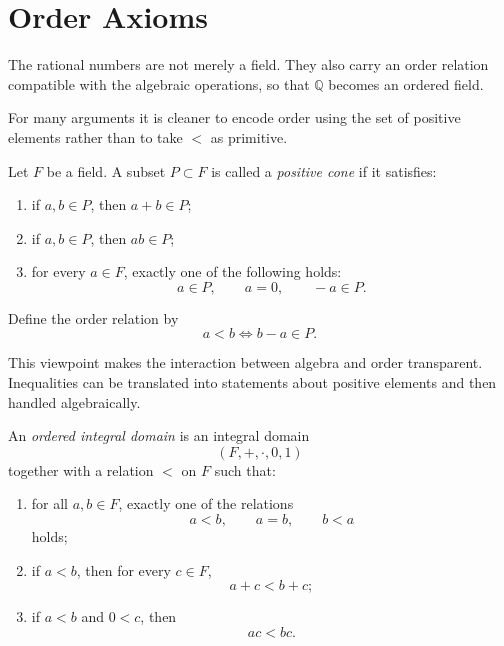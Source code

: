 
\section{Order Axioms}
\label{sec:order-axioms-q}

The rational numbers are not merely a field. They also carry an order
relation compatible with the algebraic operations, so that $\mathbb{Q}$
becomes an ordered field.

\begin{remark}
For many arguments it is cleaner to encode order using the set of
positive elements rather than to take $<$ as primitive.
\end{remark}

\begin{definition}
\label{def:positive-cone}
Let $F$ be a field. A subset $P\subset F$ is called a \emph{positive
cone} if it satisfies:
\begin{enumerate}
  \item if $a,b\in P$, then $a+b\in P$;
  \item if $a,b\in P$, then $ab\in P$;
  \item for every $a\in F$, exactly one of the following holds:
  \[
  a\in P,
  \qquad
  a=0,
  \qquad
  -a\in P.
  \]
\end{enumerate}
Define the order relation by
\[
a<b \iff b-a\in P.
\]
\end{definition}

\begin{remark}
This viewpoint makes the interaction between algebra and order
transparent. Inequalities can be translated into statements about
positive elements and then handled algebraically.
\end{remark}

\begin{definition}
\label{def:ordered-integral-domain}
An \emph{ordered integral domain} is an integral domain
\[
(F,+,\cdot,0,1)
\]
together with a relation $<$ on $F$ such that:
\begin{enumerate}
  \item for all $a,b\in F$, exactly one of the relations
  \[
  a<b,\qquad a=b,\qquad b<a
  \]
  holds;
  \item if $a<b$, then for every $c\in F$,
  \[
  a+c<b+c;
  \]
  \item if $a<b$ and $0<c$, then
  \[
  ac<bc.
  \]
\end{enumerate}
\end{definition}

